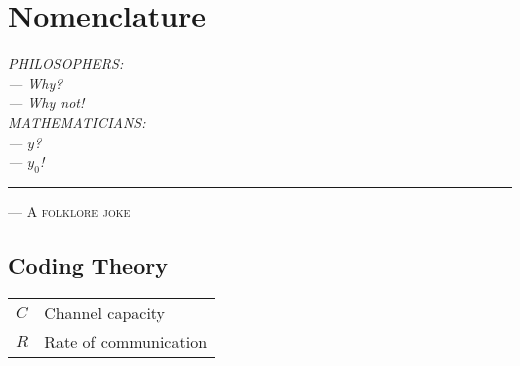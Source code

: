 \chapter*{Nomenclature}

\hfill
\begin{minipage}[t]{.75\textwidth}
  \textit{PHILOSOPHERS: \\
    --- Why? \\
    --- Why not! \\
    MATHEMATICIANS:\\
    --- $y$? \\
    --- $y_0$!}\\
  \hrule
  \vspace{.2cm}
  \hfill
  \textsc{--- A folklore joke}
\end{minipage}

\section*{Coding Theory}
\begin{longtable}{ >{\raggedleft\arraybackslash}p{} | p{} } 
$C$ & Channel capacity \\
$R$ & Rate of communication
\end{longtable}



